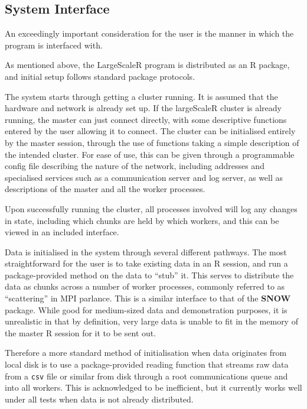 \subsection{System Interface}

An exceedingly important consideration for the user is the manner in which the program is interfaced with.

As mentioned above, the LargeScaleR program is distributed as an R package, and initial setup follows standard package protocols.

The system starts through getting a cluster running.
It is assumed that the hardware and network is already set up.
If the largeScaleR cluster is already running, the master can just connect directly, with some descriptive functions entered by the user allowing it to connect.
The cluster can be initialised entirely by the master session, through the use of functions taking a simple description of the intended cluster.
For ease of use, this can be given through a programmable config file describing the nature of the network, including addresses and specialised services such as a communication server and log server, as well as descriptions of the master and all the worker processes.

Upon successfully running the cluster, all processes involved will log any changes in state, including which chunks are held by which workers, and this can be viewed in an included interface.

Data is initialised in the system through several different pathways.
The most straightforward for the user is to take existing data in an R session, and run a package-provided method on the data to ``stub'' it.
This serves to distribute the data as chunks across a number of worker processes, commonly referred to as ``scattering'' in MPI parlance.
This is a similar interface to that of the \textbf{SNOW} package.
While good for medium-sized data and demonstration purposes, it is unrealistic in that by definition, very large data is unable to fit in the memory of the master R session for it to be sent out.

Therefore a more standard method of initialisation when data originates from local disk is to use a package-provided reading function that streams raw data from a \texttt{csv} file or similar from disk through a root communications queue and into all workers.
This is acknowledged to be inefficient, but it currently works well under all tests when data is not already distributed.

